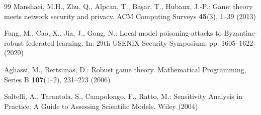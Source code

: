 \documentclass[12pt,a4paper]{article}
\theoremstyle{definition}
\begin{document}
\begin{thebibliography}{99}
Manshaei, M.H., Zhu, Q., Alpcan, T., Başar, T., Hubaux, J.-P.: Game theory meets network security and privacy. ACM Computing Surveys \textbf{45}(3), 1--39 (2013)

Fang, M., Cao, X., Jia, J., Gong, N.: Local model poisoning attacks to Byzantine-robust federated learning. In: 29th USENIX Security Symposium, pp. 1605--1622 (2020)

Aghassi, M., Bertsimas, D.: Robust game theory. Mathematical Programming, Series B \textbf{107}(1--2), 231--273 (2006)

Saltelli, A., Tarantola, S., Campolongo, F., Ratto, M.: Sensitivity Analysis in Practice: A Guide to Assessing Scientific Models. Wiley (2004)

\end{thebibliography}
\end{document}
